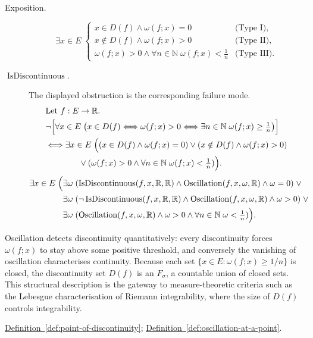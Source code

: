 \begin{remark*}
\begin{description}
  \item[Exposition.]
\[
\exists x\in E\;
\begin{cases}
x\in D(f)\land \omega(f;x)=0 & \text{(Type I)},\\[4pt]
x\notin D(f)\land \omega(f;x)>0 & \text{(Type II)},\\[4pt]
\omega(f;x)>0\land \forall n\in\mathbb{N}\; \omega(f;x)<\tfrac1n & \text{(Type III)}.
\end{cases}
\]


  \item[\(\operatorname{IsDiscontinuous}.\)]
  The displayed obstruction is the corresponding failure mode.
  \[
\begin{aligned}
&\text{Let } f:E\to\mathbb{R}.\\
&\neg\Bigl[\forall x\in E\;\bigl(x\in D(f)\Longleftrightarrow \omega(f;x)>0 \Longleftrightarrow \exists n\in\mathbb{N}\; \omega(f;x)\ge \tfrac1n\bigr)\Bigr]\\
&\Longleftrightarrow \exists x\in E\;\Bigl((x\in D(f)\land \omega(f;x)=0)\lor(x\notin D(f)\land \omega(f;x)>0)\\
&\qquad\qquad\lor(\omega(f;x)>0\land \forall n\in\mathbb{N}\; \omega(f;x)<\tfrac1n)\Bigr).
\end{aligned}
  \]
  \[
\begin{aligned}
\exists x\in E\;\Bigl(
&\exists \omega\;(\operatorname{IsDiscontinuous}(f,x,\mathbb{R},\mathbb{R})\land \operatorname{Oscillation}(f,x,\omega,\mathbb{R})\land \omega=0)\;\lor\\
&\exists \omega\;(\neg\operatorname{IsDiscontinuous}(f,x,\mathbb{R},\mathbb{R})\land \operatorname{Oscillation}(f,x,\omega,\mathbb{R})\land \omega>0)\;\lor\\
&\exists \omega\;(\operatorname{Oscillation}(f,x,\omega,\mathbb{R})\land \omega>0\land \forall n\in\mathbb{N}\; \omega<\tfrac1n)
\Bigr).
\end{aligned}
  \]
\end{description}
\end{remark*}

\begin{remark*}[Interpretation]
Oscillation detects discontinuity quantitatively: every discontinuity forces $\omega(f;x)$ to stay above some positive threshold, and conversely the vanishing of oscillation characterises continuity. Because each set $\{x\in E:\omega(f;x)\ge 1/n\}$ is closed, the discontinuity set $D(f)$ is an $F_{\sigma}$, a countable union of closed sets. This structural description is the gateway to measure-theoretic criteria such as the Lebesgue characterisation of Riemann integrability, where the size of $D(f)$ controls integrability.
\end{remark*}

\begin{dependencies}
\hyperref[def:point-of-discontinuity]{Definition~\ref*{def:point-of-discontinuity}};
\hyperref[def:oscillation-at-a-point]{Definition~\ref*{def:oscillation-at-a-point}}.
\end{dependencies}
